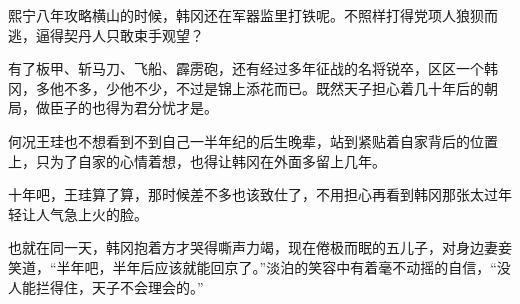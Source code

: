 熙宁八年攻略横山的时候，韩冈还在军器监里打铁呢。不照样打得党项人狼狈而逃，逼得契丹人只敢束手观望？

有了板甲、斩马刀、飞船、霹雳砲，还有经过多年征战的名将锐卒，区区一个韩冈，多他不多，少他不少，不过是锦上添花而已。既然天子担心着几十年后的朝局，做臣子的也得为君分忧才是。

何况王珪也不想看到不到自己一半年纪的后生晚辈，站到紧贴着自家背后的位置上，只为了自家的心情着想，也得让韩冈在外面多留上几年。

十年吧，王珪算了算，那时候差不多也该致仕了，不用担心再看到韩冈那张太过年轻让人气急上火的脸。

也就在同一天，韩冈抱着方才哭得嘶声力竭，现在倦极而眠的五儿子，对身边妻妾笑道，“半年吧，半年后应该就能回京了。”淡泊的笑容中有着毫不动摇的自信，“没人能拦得住，天子不会理会的。”

